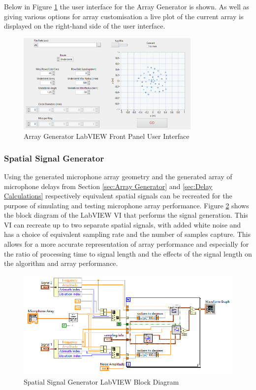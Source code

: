 \documentclass{UoNMCHA}
\numberwithin{equation}{section}
\begin{document}
    Below in Figure \ref{fig:ArrayGenPanel} the user interface for the Array Generator is shown. As well as giving various options for array customisation a live plot of the current array is displayed on the right-hand side of the user interface.  
    
    \begin{figure}[H]
        \centering
        \includegraphics[keepaspectratio, width = 0.8\textwidth]{Figures/ArrayGenPanel.png}
        \caption{Array Generator LabVIEW Front Panel User Interface}
        \label{fig:ArrayGenPanel}
    \end{figure}
    
\subsubsection{Spatial Signal Generator} \label{sec:Signal Generator}
    Using the generated microphone array geometry and the generated array of microphone delays from Section \ref{sec:Array Generator} and \ref{sec:Delay Calculations} respectively equivalent spatial signals can be recreated for the purpose of simulating and testing microphone array performance. Figure \ref{fig:SignalGenBlock} shows the block diagram of the LabVIEW VI that performs the signal generation. This VI can recreate up to two separate spatial signals, with added white noise and has a choice of equivalent sampling rate and the number of samples capture. This allows for a more accurate representation of array performance and especially for the ratio of processing time to signal length and the effects of the signal length on the algorithm and array performance. 
    
    \begin{figure}[H]
        \centering
        \includegraphics[keepaspectratio, width = \textwidth]{Figures/SignalGenBlock.png}
        \caption{Spatial Signal Generator LabVIEW Block Diagram}
        \label{fig:SignalGenBlock}
    \end{figure}    
    
\end{document}
